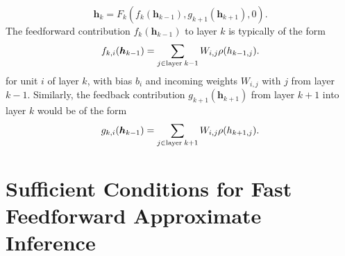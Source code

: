 \documentclass{article}
\newcommand   \vh{{\bm h}}
\begin{document}
\begin{equation}
 \vh_k = F_k(f_k(\vh_{k-1}),g_{k+1}(\vh_{k+1}),0).
\end{equation}
The feedforward contribution $f_k(\vh_{k-1})$ to layer $k$ is typically of the form
\begin{equation}
   f_{k,i}(\vh_{k-1}) = \sum_{j \in {\rm layer}\; k-1} W_{i,j} \rho(h_{k-1,j}).
\end{equation}
for unit $i$ of layer $k$, with bias $b_i$ and incoming weights $W_{i,j}$ with $j$ from layer $k-1$.
Similarly, the feedback contribution $g_{k+1}(\vh_{k+1})$ from layer $k+1$ into layer $k$ would
be of the form
\begin{equation}
   g_{k,i}(\vh_{k-1}) = \sum_{j \in {\rm layer}\; k+1} W_{i,j} \rho(h_{k+1,j}).
\end{equation}



\section{Sufficient Conditions for Fast Feedforward Approximate Inference}
\end{document}
